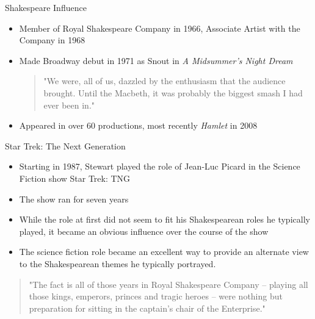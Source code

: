 \documentclass[xcolor=dvipsnames]{beamer}
\begin{document}
\begin{frame}{Shakespeare Influence}
  \begin{itemize}
    \item Member of Royal Shakespeare Company in 1966, Associate Artist with the Company in 1968
    \item Made Broadway debut in 1971 as Snout in \emph{A Midsummer's Night Dream}
    \begin{qct}
      \begin{quote}
        "We were, all of us, dazzled by the enthusiasm that the audience
        brought. Until the Macbeth, it was probably the biggest smash I had ever
        been in."
      \end{quote}
    \end{qct}
    \item Appeared in over 60 productions, most recently \emph{Hamlet} in 2008
  \end{itemize}
\end{frame}

\begin{frame}{Star Trek: The Next Generation}
  \begin{itemize}
    \item Starting in 1987, Stewart played the role of Jean-Luc Picard in the
    Science Fiction show Star Trek: TNG
    \item The show ran for seven years
    \item While the role at first did not seem to fit his Shakespearean roles he
    typically played, it became an obvious influence over the course of the show
    \item The science fiction role became an excellent way to provide an
    alternate view to the Shakespearean themes he typically portrayed.
  \end{itemize}
  \begin{qct}
    \begin{quote}
      "The fact is all of those years in Royal Shakespeare Company -- playing
      all those kings, emperors, princes and tragic heroes -- were nothing but
      preparation for sitting in the captain's chair of the Enterprise."
    \end{quote}
  \end{qct}
\end{frame}
\end{document}
